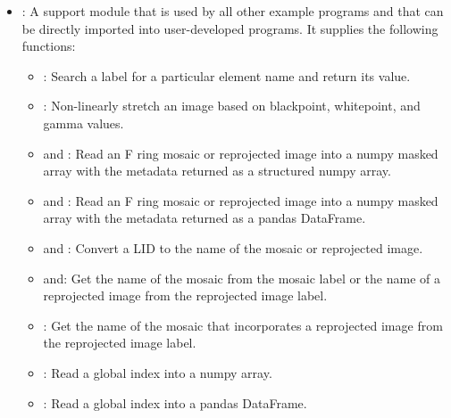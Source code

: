 \begin{itemize}
\item {}: A support module that is used by all other example programs and that can be directly imported into user-developed programs. It supplies the following functions:
\begin{itemize}
\item {}: Search a label for a particular element name and return its value.
\item {}: Non-linearly stretch an image based on blackpoint, whitepoint, and gamma values.
\item {} and : Read an F ring mosaic or reprojected image into a numpy masked array with the metadata returned as a structured numpy array.
\item {} and : Read an F ring mosaic or reprojected image into a numpy masked array with the metadata returned as a pandas DataFrame.
\item {} and : Convert a LID to the name of the mosaic or reprojected image.
\item {} and\newline {}: Get the name of the mosaic from the mosaic label or the name of a reprojected image from the reprojected image label.
\item {}: Get the name of the mosaic that incorporates a reprojected image from the reprojected image label.
\item {}: Read a global index into a numpy array.
\item {}: Read a global index into a pandas DataFrame.
\end{itemize}

\end{itemize}
